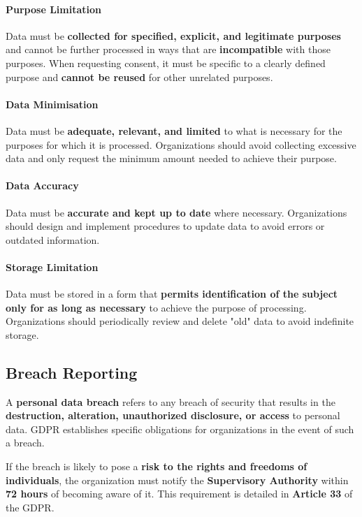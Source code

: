 \paragraph{Purpose Limitation}  
Data must be \textbf{collected for specified, explicit, and legitimate
purposes} and cannot be further processed in ways that are
\textbf{incompatible} with those purposes. When requesting consent,
it must be specific to a clearly defined purpose and \textbf{cannot be
reused} for other unrelated purposes.

\paragraph{Data Minimisation}  
Data must be \textbf{adequate, relevant, and limited} to what is
necessary for the purposes for which it is processed. Organizations
should avoid collecting excessive data and only request the minimum
amount needed to achieve their purpose.  

\paragraph{Data Accuracy}  
Data must be \textbf{accurate and kept up to date} where necessary.
Organizations should design and implement procedures to update data to
avoid errors or outdated information.  

\paragraph{Storage Limitation}  
Data must be stored in a form that \textbf{permits identification of
the subject only for as long as necessary} to achieve the purpose of
processing. Organizations should periodically review and delete "old"
data to avoid indefinite storage.  

\subsection{Breach Reporting}

\begin{boxH}
  A \textbf{personal data breach} refers to any breach of security
  that results in the \textbf{destruction, alteration, unauthorized
  disclosure, or access} to personal data. GDPR establishes specific
  obligations for organizations in the event of such a breach.
\end{boxH}

If the breach is likely to pose a \textbf{risk to the rights and
freedoms of individuals}, the organization must notify the
\textbf{Supervisory Authority} within \textbf{72 hours} of becoming
aware of it. This requirement is detailed in \textbf{Article 33} of
the GDPR.

